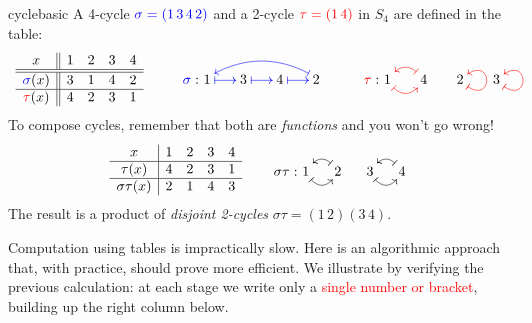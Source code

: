 \begin{example}{}{cyclebasic}
	A 4-cycle $\textcolor{blue}{\sigma=(1\,3\,4\,2)}$ and a 2-cycle $\textcolor{red}{\tau=(1\,4)}$ in $S_4$ are defined in the table:
	\[
		\begin{array}[t]{c||cccc}
			x&1&2&3&4\\\hline\hline
			\textcolor{blue}{\sigma}(x)&3&1&4&2\\\hline
			\textcolor{red}{\tau}(x)&4&2&3&1
		\end{array}
		\qquad\qquad
		\SelectTips{cm}{}
		\xymatrix @C15pt @R5pt{%
			&&&\\
		 	\makebox[0pt][r]{$\textcolor{blue}{\sigma}:\ $}1 \ar@{|->}@[blue][r] & 3 \ar@{|->}@[blue][r] & 4 \ar@{|->}@[blue][r] & 2 \ar@/_1.0pc/@<-2pt>@{|->}@[blue][lll]
		}
		\qquad\qquad
		\SelectTips{cm}{}
		\xymatrix @C15pt @R5pt{%
			&&&\\
		 	\makebox[0pt][r]{$\textcolor{red}{\tau}:$\ }1 \ar@/_0.8pc/@{|->}@[red][r]& 4 \ar@/_0.8pc/@{|->}@[red][l] & 2 \ar@{|->}@(dr,ur)@[red] & 3 \ar@{|->}@(dr,ur)@[red]
		}
	\]
	To compose cycles, remember that both are \emph{functions} and you won't go wrong!
	\[
		\begin{array}[t]{c|cccc}
			x&1&2&3&4\\\hline
			\tau(x)&4&2&3&1\\\hline
			\sigma\tau(x)&2&1&4&3
		\end{array}
		\qquad\qquad
		\SelectTips{cm}{}
		\xymatrix @C12pt @R5pt{%
			&&&\\
	 		\makebox[0pt][r]{$\sigma\tau:$\ }1 \ar@/_0.8pc/@{|->}[r] & 2 \ar@/_0.8pc/@{|->}[l] & 3 \ar@/_0.8pc/@{|->}[r] & 4 \ar@/_0.8pc/@{|->}[l]
		}
	\]
	The result is a product of \emph{disjoint 2-cycles} $\sigma\tau=(1\,2)(3\,4)$.
\end{example}



\label{pg:cyclenot}

Computation using tables is impractically slow. Here is an algorithmic approach that, with practice, should prove more efficient. We illustrate by verifying the previous calculation: at each stage we write only a \textcolor{red}{single number or bracket}, building up the right column below.

